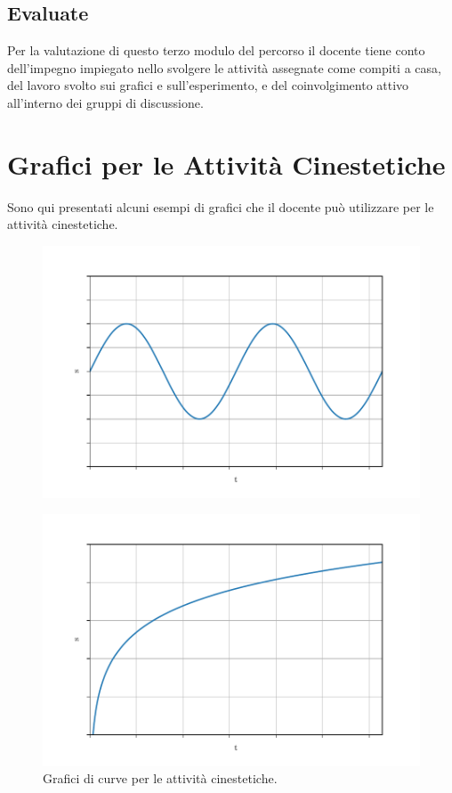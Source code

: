 \documentclass{report} \usepackage[T1]{fontenc} \usepackage[italian]{babel}
\begin{document}
\section{Evaluate}
Per la valutazione di questo terzo modulo del percorso il docente tiene conto
dell'impegno impiegato nello svolgere le attività assegnate come compiti a casa,
del lavoro svolto sui grafici e sull'esperimento, e del coinvolgimento attivo
all’interno dei gruppi di discussione.

\appendix
\chapter{Grafici per le Attività Cinestetiche}\label{appendix_kine}
Sono qui presentati alcuni esempi di grafici che il docente può
utilizzare per le attività cinestetiche.

\begin{figure}[H]
\centering
  \includegraphics[width=\textwidth]{kine_plot4}
  \label{fig:kine_plot4}
\end{figure}

\begin{figure}[H]
\centering
  \includegraphics[width=\textwidth]{kine_plot5}
  \caption{Grafici di curve per le attività
           cinestetiche.}
  \label{fig:kine_plot5}
\end{figure}
\end{document}
